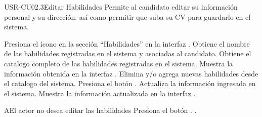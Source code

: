 \begin{UseCase}[]{USR-CU02.3}{Editar Habilidades}{
	Permite al candidato editar su información personal y su dirección. así como permitir que suba su CV para guardarlo en el sistema.
}
\end{UseCase}

\begin{UCtrayectoria}
	\UCpaso [\UCactor] Presiona el ícono \IUEditar{} en la sección ``Habilidades'' en la interfaz . 
	\UCpaso Obtiene el nombre de las habilidades registradas en el sistema y asociadas al candidato.
	\UCpaso Obtiene el catalogo completo de  las habilidades registradas en el sistema.
	\UCpaso [\UCsist] Muestra la información obtenida en la interfaz .
	\UCpaso \label{USRCU02-1-1} Elimina y/o agrega nuevas habilidades desde el catalogo del sistema.
	\UCpaso [\UCsist] Presiona el botón .
	\UCpaso Actualiza la información ingresada en el sistema.
	\UCpaso Muestra la información actualizada en la interfaz . 
\end{UCtrayectoria}

\begin{UCtrayectoriaA}{A}{El actor no desea editar las habilidades}
	\UCpaso [\UCsist] Presiona el botón .
	.
\end{UCtrayectoriaA} 


